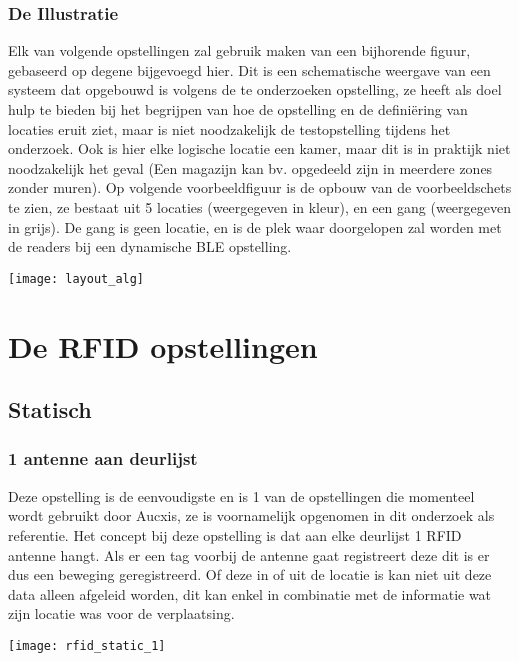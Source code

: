 \subsubsection{De Illustratie}
\begin{minipage}{0.65\textwidth}
Elk van volgende opstellingen zal gebruik maken van een bijhorende figuur, gebaseerd op degene bijgevoegd hier. Dit is een schematische weergave van een systeem dat opgebouwd is volgens de te onderzoeken opstelling, ze heeft als doel hulp te bieden bij het begrijpen van hoe de opstelling en de definiëring van locaties eruit ziet, maar is niet noodzakelijk de testopstelling tijdens het onderzoek. Ook is hier elke logische locatie een kamer, maar dit is in praktijk niet noodzakelijk het geval (Een magazijn kan bv. opgedeeld zijn in meerdere zones zonder muren). Op volgende voorbeeldfiguur is de opbouw van de voorbeeldschets te zien, ze bestaat uit 5 locaties (weergegeven in kleur), en een gang (weergegeven in grijs). De gang is geen locatie, en is de plek waar doorgelopen zal worden met de readers bij een dynamische BLE opstelling.
\end{minipage}
\hfill
\begin{minipage}{0.30\textwidth}
	\texttt{[image: layout\_alg]}
\end{minipage}

\section[RFID]{De RFID opstellingen}
\label{ch:rfid}

\subsection{Statisch}

\subsubsection{1 antenne aan deurlijst}
\begin{minipage}{0.65\textwidth}
Deze opstelling is de eenvoudigste en is 1 van de opstellingen die momenteel wordt gebruikt door Aucxis, ze is voornamelijk opgenomen in dit onderzoek als referentie. Het concept bij deze opstelling is dat aan elke deurlijst 1 RFID antenne hangt. Als er een tag voorbij de antenne gaat registreert deze dit is er dus een beweging geregistreerd. Of deze in of uit de locatie is kan niet uit deze data alleen afgeleid worden, dit kan enkel in combinatie met de informatie wat zijn locatie was voor de verplaatsing. 
\end{minipage}
\hfill
\begin{minipage}{0.30\textwidth}
	\texttt{[image: rfid\_static\_1]}
\end{minipage}

